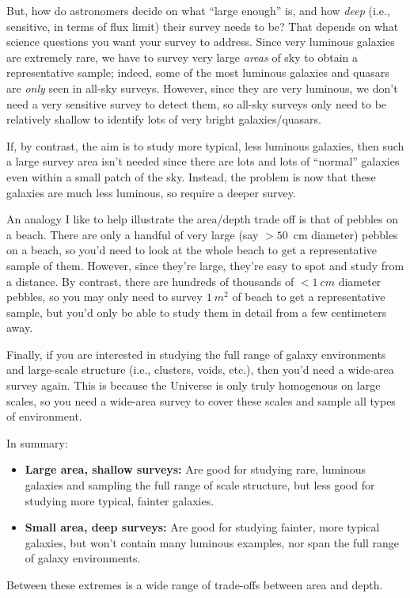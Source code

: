 \documentclass[11pt]{article}
\begin{document}
But, how do astronomers decide on what ``large enough'' is, and how
{\it deep} (i.e., sensitive, in terms of flux limit) their survey
needs to be?  That depends on what science questions you want your
survey to address. Since very luminous galaxies are extremely rare, we
have to survey very large {\it areas} of sky to obtain a
representative sample; indeed, some of the most luminous galaxies
and quasars are {\it only} seen in all-sky surveys. However, since
they are very luminous, we don't need a very sensitive survey to
detect them, so all-sky surveys only need to be relatively shallow to
identify lots of very bright galaxies/quasars.

If, by contrast, the aim is to study more typical, less luminous
galaxies, then such a large survey area isn't needed since there are
lots and lots of ``normal'' galaxies even within a small patch of the
sky. Instead, the problem is now that these galaxies are much less
luminous, so require a deeper survey.

An analogy I like to help illustrate the area/depth trade off is that
of pebbles on a beach. There are only a handful of very large (say
$>50$~cm diameter) pebbles on a beach, so you'd need to look at the
whole beach to get a representative sample of them. However, since
they're large, they're easy to spot and study from a distance. By
contrast, there are hundreds of thousands of $<1~cm$ diameter pebbles,
so you may only need to survey $1~m^2$ of beach to get a
representative sample, but you'd only be able to study them in detail
from a few centimeters away.

Finally, if you are interested in studying the full range of galaxy
environments and large-scale structure (i.e., clusters, voids, etc.),
then you'd need a wide-area survey again. This is because the Universe
is only truly homogenous on large scales, so you need a wide-area
survey to cover these scales and sample all types of environment.

In summary:
\begin{itemize}
\item {\bf Large area, shallow surveys:} Are good for studying rare,
  luminous galaxies and sampling the full range of scale structure,
  but less good for studying more typical, fainter galaxies.
\item {\bf Small area, deep surveys:} Are good for studying fainter,
  more typical galaxies, but won't contain many luminous examples, nor
  span the full range of galaxy environments.
\end{itemize}
Between these extremes is a wide range of trade-offs between area and
depth.
\end{document}
